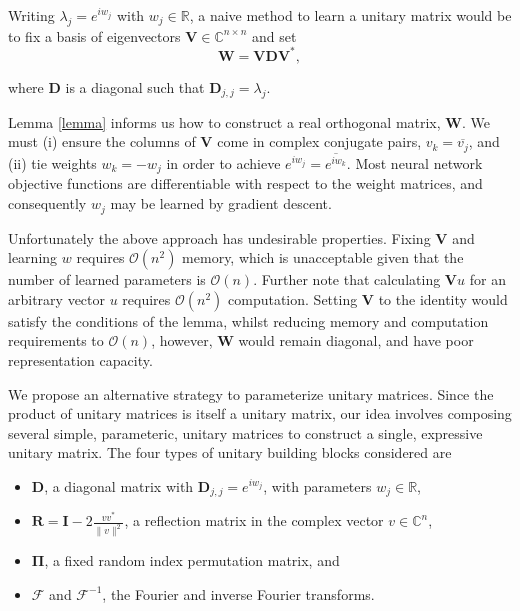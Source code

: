 \documentclass{article} %
\newcommand{\matr}[1]{\mathbf{#1}}
\newcommand\RR{\mathbb{R}}
\begin{document}
Writing $\lambda_j = e^{i w_j}$ with $w_j \in \RR$, a naive method to learn a unitary matrix would be to
fix a basis of eigenvectors $\matr{V} \in \mathbb{C}^{n \times n}$ and set
\begin{equation} \matr{W} = \matr{V} \matr{D} \matr{V}^{*} , \end{equation}

where $\matr{D}$ is a diagonal such that $\matr{D}_{j,j} = \lambda_j$. 

Lemma \ref{lemma} informs us how to construct a real orthogonal matrix, $\matr{W}$.
We must (i) ensure the columns of $\matr{V}$ come in complex conjugate pairs, $v_k = \overline{v_j}$, and
(ii) tie weights $w_k=-w_j$ in order to achieve $e^{i w_j} = \overline{e^{i w_k}}$. 
Most neural network objective functions are differentiable with respect to the weight matrices,
and consequently $w_j$ may be learned by gradient descent. 

Unfortunately the above approach has undesirable properties. 
Fixing $\matr{V}$ and learning $w$ requires $\mathcal{O}\left(n^2\right)$ memory, 
which is unacceptable given that the number of learned parameters is $\mathcal{O}(n)$. 
Further note that calculating $\matr{V} u$ for an arbitrary vector $u$ 
requires $\mathcal{O}(n^2)$ computation. 
Setting $\matr{V}$ to the identity would satisfy the conditions of the lemma, whilst reducing  
memory and computation requirements to $\mathcal{O}(n)$, however, $\matr{W}$ would remain diagonal, 
and have poor representation capacity.

We propose an alternative strategy to parameterize unitary matrices. 
Since the product of unitary matrices is itself a unitary matrix, our idea involves
composing several simple, parameteric, unitary matrices to construct a single, expressive unitary matrix.
The four types of unitary building blocks considered are 

\begin{itemize}
  \item $\matr{D}$, a diagonal matrix with $\matr{D}_{j,j} = e^{i w_j}$, with parameters $w_j \in \RR$,
  \item $\matr{R} = \matr{I} - 2 \frac{v v^*}{\|v\|^2}$, a reflection matrix in the complex vector 
  $v \in \mathbb{C}^n$, 
  \item $\matr{\Pi}$, a fixed random index permutation matrix, and
  \item $\mathcal{F}$ and $\mathcal{F}^{-1}$, the Fourier and inverse Fourier transforms.
\end{itemize}
\end{document}
